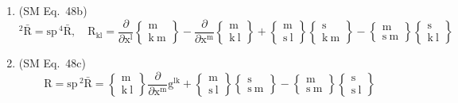 \documentclass[12pt]{article}
\begin{document}
\begin{enumerate}[label=(\arabic*), series=formellist]
    \item (SM Eq.\ 48b) 
    \[
    {}^2\bar{\mathrm{R}} = \mathrm{sp} \, {}^4\bar{\mathrm{R}}, \quad \mathrm{R}_{\mathrm{kl}} = \frac{\partial}{\partial \mathrm{x^l}}\left\{ \begin{smallmatrix} \mathrm{m} \\ \mathrm{k\ m} \end{smallmatrix} \right\} - \frac{\partial}{\partial \mathrm{x^m}}\left\{ \begin{smallmatrix} \mathrm{m} \\ \mathrm{k\ l} \end{smallmatrix} \right\} + \left\{ \begin{smallmatrix} \mathrm{m} \\ \mathrm{s\ l} \end{smallmatrix} \right\}\left\{ \begin{smallmatrix} \mathrm{s} \\ \mathrm{k\ m} \end{smallmatrix} \right\} - \left\{ \begin{smallmatrix} \mathrm{m} \\ \mathrm{s\ m} \end{smallmatrix} \right\}\left\{ \begin{smallmatrix} \mathrm{s} \\ \mathrm{k\ l} \end{smallmatrix} \right\}
    \]

    \item (SM Eq.\ 48c) 
    \[
    \mathrm{R} = \mathrm{sp} \, {}^2\bar{\mathrm{R}} = \left\{ \begin{smallmatrix} \mathrm{m} \\ \mathrm{k\ l} \end{smallmatrix} \right\}\frac{\partial}{\partial \mathrm{x^m}} \mathrm{g}^{\mathrm{lk}} + \left\{ \begin{smallmatrix} \mathrm{m} \\ \mathrm{s\ l} \end{smallmatrix} \right\}\left\{ \begin{smallmatrix} \mathrm{s} \\ \mathrm{s\ m} \end{smallmatrix} \right\} - \left\{ \begin{smallmatrix} \mathrm{m} \\ \mathrm{s\ m} \end{smallmatrix} \right\}\left\{ \begin{smallmatrix} \mathrm{s} \\ \mathrm{s\ l} \end{smallmatrix} \right\}
    \]


\end{enumerate}
\end{document}
